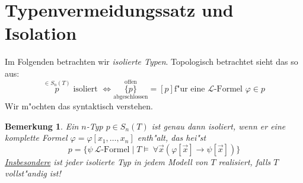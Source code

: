 \documentclass[a4paper,12pt,numbers=noenddot,parskip=full]{scrartcl}
\newcommand{\Forall}{~\forall}
\newcommand{\scrL}{\mathcal{L}}
\theoremstyle{dotless}
\newtheorem{remark}[theorem]{Bemerkung}
\begin{document}
\section{Typenvermeidungssatz und Isolation}
Im Folgenden betrachten wir \emph{isolierte Typen}. Topologisch betrachtet sieht das so aus:
\begin{equation*}
	\overset{\in S_n(T)}{p} \text{ isoliert } \Longleftrightarrow \underset{\text{abgeschlossen}}{\overset{\text{offen}}{\{p\}}} = [p] \text{f"ur eine } \scrL \text{-Formel } \varphi \in p
\end{equation*}
Wir m"ochten das syntaktisch verstehen.
\begin{remark}\label{bem:voll}
	Ein $n$-Typ $p \in S_n(T)$ ist genau dann isoliert, wenn er eine \emph{komplette} Formel $\varphi =\varphi[x_1, \dots, x_n]$ enth"alt, das hei"st
	\begin{equation*}
		p = \{\psi~ \scrL\text{-Formel} \mid T \models \Forall \vec{x} (\varphi[\vec{x}] \rightarrow \psi[\vec{x}]) \}
	\end{equation*}
	\underline{Insbesondere} ist jeder isolierte Typ in jedem Modell von $T$ realisiert, falls $T$ vollst"andig ist!
\end{remark}
\end{document}
